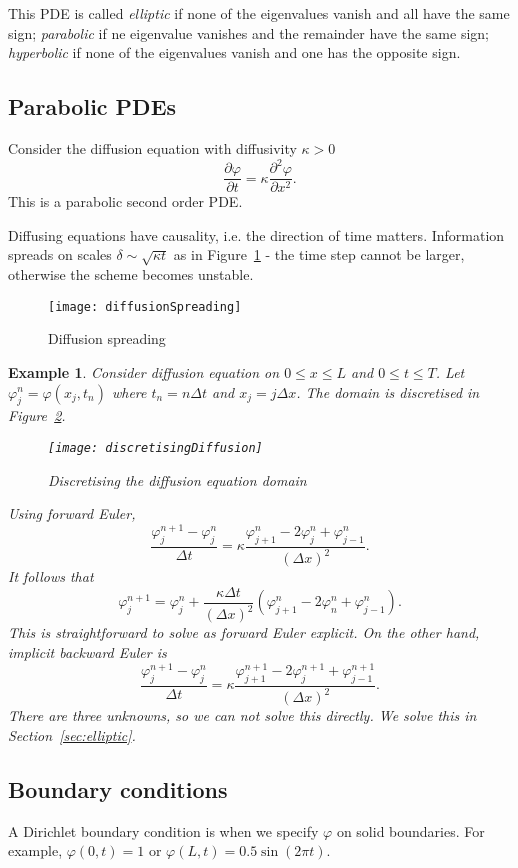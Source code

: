 \documentclass[11pt, a4paper]{article}
\renewcommand{\phi}{\varphi}
\theoremstyle{break}
\newtheorem{eg}[thm]{Example}
\newcommand*{\Paren}[1]{\left(#1\right)}%
\newcommand{\dt}{\Delta t}
\newcommand{\dx}{\Delta x}
\newcommand{\der}[2]{\frac{\partial #1}{\partial #2}}
\newcommand{\pder}[3][2]{\frac{\partial^#1 #2}{\partial #3^#1}}
\begin{document}
This PDE is called \emph{elliptic} if none of the eigenvalues vanish and all have the same sign; \emph{parabolic} if ne eigenvalue vanishes and the remainder have the same sign; \emph{hyperbolic} if none of the eigenvalues vanish and one has the opposite sign.

\subsection{Parabolic PDEs}

Consider the diffusion equation with diffusivity $\kappa>0$ \[\der\phi t=\kappa\pder\phi x.\] This is a parabolic second order PDE. 

Diffusing equations have causality, i.e. the direction of time matters. Information spreads on scales $\delta\sim\sqrt{\kappa t}$ as in Figure~\ref{fig:diffusionTopHat} - the time step cannot be larger, otherwise the scheme becomes unstable.

\begin{figure}
	\centering
	\texttt{[image: diffusionSpreading]}
	\caption{Diffusion spreading}
	\label{fig:diffusionTopHat}
\end{figure}

\begin{eg}
	Consider diffusion equation on $0\leq x\leq L$ and $0\leq t\leq T$.  Let $\phi_j^n=\phi(x_j,t_n)$ where $t_n=n\dt$ and $x_j=j\dx$. The domain is discretised in Figure~\ref{fig:diffusionDiscret}.
	
	\begin{figure}\centering
		\texttt{[image: discretisingDiffusion]}
		\caption{Discretising the diffusion equation domain}\label{fig:diffusionDiscret}
	\end{figure}
	
	Using forward Euler, \[\frac{\phi_j^{n+1}-\phi_j^n}{\dt}=\kappa\frac{\phi_{j+1}^n-2\phi_j^n+\phi^n_{j-1}}{(\dx)^2}.\] It follows that \[\phi_j^{n+1}=\phi_j^n+\frac{\kappa\dt}{(\dx)^2}\Paren{\phi_{j+1}^n-2\phi_n^n+\phi_{j-1}^n}.\] This is straightforward to solve as forward Euler explicit. On the other hand, implicit backward Euler is \[\frac{\phi_j^{n+1}-\phi_j^n}{\dt}=\kappa\frac{\phi_{j+1}^{n+1}-2\phi_j^{n+1}+\phi^{n+1}_{j-1}}{(\dx)^2}.\] There are three unknowns, so we can not solve this directly. We solve this in Section~\ref{sec:elliptic}.

\end{eg}

\subsection{Boundary conditions}
A Dirichlet boundary condition is when we specify $\phi$ on solid boundaries. For example, $\phi(0,t)=1$ or $\phi(L,t)=0.5\sin(2\pi t)$.
\end{document}
